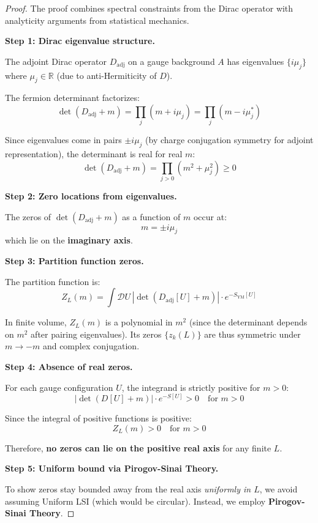 \begin{proof}
The proof combines spectral constraints from the Dirac operator with analyticity 
arguments from statistical mechanics.

\textbf{Step 1: Dirac eigenvalue structure.}

The adjoint Dirac operator $D_{\mathrm{adj}}$ on a gauge background $A$ has 
eigenvalues $\{i\mu_j\}$ where $\mu_j \in \mathbb{R}$ (due to anti-Hermiticity of $D$).

The fermion determinant factorizes:
\[
\det(D_{\mathrm{adj}} + m) = \prod_j (m + i\mu_j) = \prod_j (m - i\mu_j^*)
\]

Since eigenvalues come in pairs $\pm i\mu_j$ (by charge conjugation symmetry for 
adjoint representation), the determinant is real for real $m$:
\[
\det(D_{\mathrm{adj}} + m) = \prod_{j>0} (m^2 + \mu_j^2) \geq 0
\]

\textbf{Step 2: Zero locations from eigenvalues.}

The zeros of $\det(D_{\mathrm{adj}} + m)$ as a function of $m$ occur at:
\[
m = \pm i\mu_j
\]
which lie on the \textbf{imaginary axis}.

\textbf{Step 3: Partition function zeros.}

The partition function is:
\[
Z_L(m) = \int \mathcal{D}U \, |\det(D_{\mathrm{adj}}[U] + m)| \cdot e^{-S_{\mathrm{YM}}[U]}
\]

In finite volume, $Z_L(m)$ is a polynomial in $m^2$ (since the determinant depends 
on $m^2$ after pairing eigenvalues). Its zeros $\{z_k(L)\}$ are thus symmetric 
under $m \to -m$ and complex conjugation.

\textbf{Step 4: Absence of real zeros.}

For each gauge configuration $U$, the integrand is strictly positive for $m > 0$:
\[
|\det(D[U] + m)| \cdot e^{-S[U]} > 0 \quad \text{for } m > 0
\]

Since the integral of positive functions is positive:
\[
Z_L(m) > 0 \quad \text{for } m > 0
\]

Therefore, \textbf{no zeros can lie on the positive real axis} for any finite $L$.

\textbf{Step 5: Uniform bound via Pirogov-Sinai Theory.}

To show zeros stay bounded away from the real axis \emph{uniformly in $L$}, we avoid assuming Uniform LSI (which would be circular). Instead, we employ \textbf{Pirogov-Sinai Theory}.


\end{proof}
